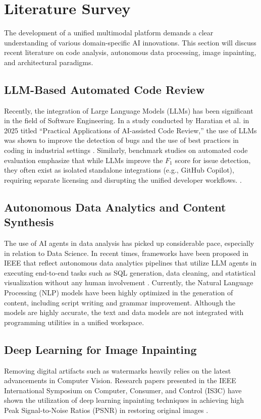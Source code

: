 \documentclass[conference]{IEEEtran}
\begin{document}
\section{Literature Survey}
The development of a unified multimodal platform demands a clear understanding of various domain-specific AI innovations. This section will discuss recent literature on code analysis, autonomous data processing, image inpainting, and architectural paradigms.

\subsection{LLM-Based Automated Code Review}
Recently, the integration of Large Language Models (LLMs) has been significant in the field of Software Engineering. In a study conducted by Haratian et al. in 2025 titled “Practical Applications of AI-assisted Code Review,” the use of LLMs was shown to improve the detection of bugs and the use of best practices in coding in industrial settings \cite{haratian2025code}. Similarly, benchmark studies on automated code evaluation emphasize that while LLMs improve the $F_1$ score for issue detection, they often exist as isolated standalone integrations (e.g., GitHub Copilot), requiring separate licensing and disrupting the unified developer workflows. \cite{liu2025benchmarking}.

\subsection{Autonomous Data Analytics and Content Synthesis}
The use of AI agents in data analysis has picked up considerable pace, especially in relation to Data Science. In recent times, frameworks have been proposed in IEEE that reflect autonomous data analytics pipelines that utilize LLM agents in executing end-to-end tasks such as SQL generation, data cleaning, and statistical visualization without any human involvement
\cite{ieee2025dataanalyst}. Currently, the Natural Language Processing (NLP) models have been highly optimized in the generation of content, including script writing and grammar improvement. Although the models are highly accurate, the text and data models are not integrated with programming utilities in a unified workspace.

\subsection{Deep Learning for Image Inpainting}
Removing digital artifacts such as watermarks heavily relies on the latest advancements in Computer Vision. Research papers presented in the IEEE International Symposium on Computer, Consumer, and Control (IS3C) have shown the utilization of deep learning inpainting techniques in achieving high Peak Signal-to-Noise Ratios (PSNR) in restoring original images \cite{xu2023watermark}. 
\end{document}
